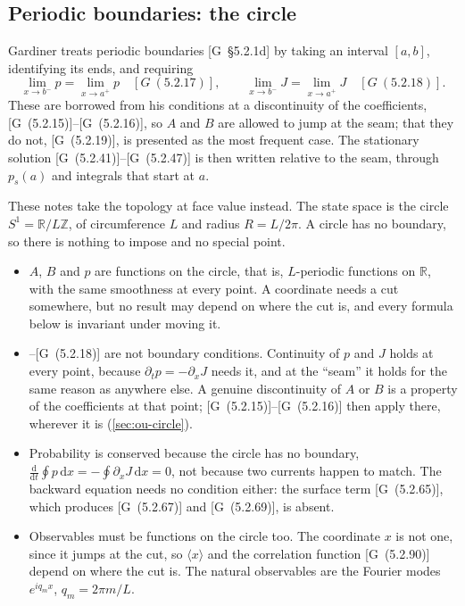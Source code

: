 \documentclass[11pt]{article}
\numberwithin{equation}{section}
\newcommand{\dd}{\mathrm{d}}
\newcommand{\avg}[1]{\langle #1\rangle}
\newcommand{\G}[1]{[G~(#1)]}
\newcommand{\Gs}[1]{[G~\S#1]}
\begin{document}
\subsection{Periodic boundaries: the circle}
\label{sec:circle-toolkit}

Gardiner treats periodic boundaries \Gs{5.2.1d} by taking an interval $[a,b]$, identifying its ends, and requiring
\begin{equation*}
  \lim_{x\to b^-}p=\lim_{x\to a^+}p\quad\G{5.2.17},\qquad \lim_{x\to b^-}J=\lim_{x\to a^+}J\quad\G{5.2.18}.
\end{equation*}
These are borrowed from his conditions at a discontinuity of the coefficients, \G{5.2.15}--\G{5.2.16}, so $A$
and $B$ are allowed to jump at the seam; that they do not, \G{5.2.19}, is presented as the most frequent case.
The stationary solution \G{5.2.41}--\G{5.2.47} is then written relative to the seam, through $p_s(a)$ and
integrals that start at $a$.

These notes take the topology at face value instead. The state space is the circle $S^1=\mathbb R/L\mathbb Z$,
of circumference $L$ and radius $R=L/2\pi$. A circle has no boundary, so there is nothing to impose and no
special point.
\begin{itemize}
  \item $A$, $B$ and $p$ are functions on the circle, that is, $L$-periodic functions on $\mathbb R$, with the
        same smoothness at every point. A coordinate needs a cut somewhere, but no result may depend on where
        the cut is, and every formula below is invariant under moving it.
  \item \G{5.2.17}--\G{5.2.18} are not boundary conditions. Continuity of $p$ and $J$ holds at every point,
        because $\partial_tp=-\partial_xJ$ needs it, and at the ``seam'' it holds for the same reason as
        anywhere else. A genuine discontinuity of $A$ or $B$ is a property of the coefficients at that point;
        \G{5.2.15}--\G{5.2.16} then apply there, wherever it is (\cref{sec:ou-circle}).
  \item Probability is conserved because the circle has no boundary,
        $\frac{\dd}{\dd t}\oint p\,\dd x=-\oint\partial_xJ\,\dd x=0$, not because two currents happen to match.
        The backward equation needs no condition either: the surface term \G{5.2.65}, which produces
        \G{5.2.67} and \G{5.2.69}, is absent.
  \item Observables must be functions on the circle too. The coordinate $x$ is not one, since it jumps at the
        cut, so $\avg x$ and the correlation function \G{5.2.90} depend on where the cut is. The natural
        observables are the Fourier modes $e^{iq_mx}$, $q_m=2\pi m/L$.
\end{itemize}
\end{document}
